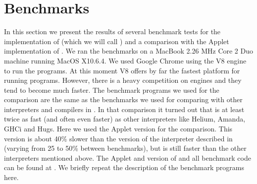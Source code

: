 \section{Benchmarks} \label{sapljs:sec:benchmarks}
In this section we present the results of several benchmark tests for the  \JavaScript implementation of \Sapl (which we will call \Sapljs) and a
comparison with the \Java Applet implementation of \Sapl. 
We ran the benchmarks on a MacBook 2.26 MHz Core 2 Duo machine running MacOS X10.6.4.
We used Google Chrome using the V8 \JavaScript engine to run the programs.
At this moment V8 offers by far the fastest platform for running \Sapljs programs.
However, there is a heavy competition on \JavaScript engines and they tend to become much faster.
The benchmark programs we used for the comparison are the same as the benchmarks  we used for comparing 
\Sapl with other interpreters and compilers in \cite{JKP}. In that comparison it turned out that \Sapl is at least twice as fast (and often even faster)
as other interpreters like \textsf{Helium}, \textsf{Amanda}, \textsf{GHCi} and \textsf{Hugs}.
Here we used the \Java Applet version for the comparison. This version is about 40\% slower than the \C  version
of the interpreter described in \cite{JKP} (varying from 25 to 50\% between benchmarks), but is still faster than the other interpreters mentioned above.
The \Java Applet and \JavaScript  version of  \Sapl  and all benchmark code can be found at \cite{SAPL}.
We briefly repeat the description of the benchmark programs here.

